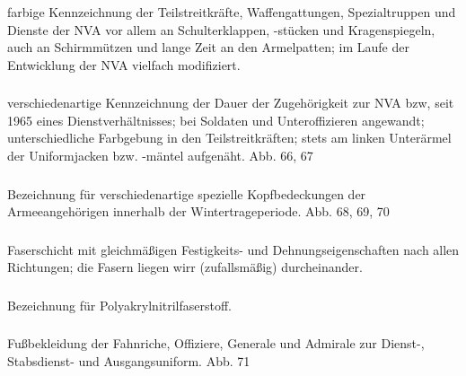 farbige Kennzeichnung der Teilstreitkräfte, Waffengattungen, Spezialtruppen und Dienste der NVA vor allem an Schulterklappen, -stücken und Kragenspiegeln, auch an Schirmmützen und lange Zeit an den Armelpatten; im Laufe der Entwicklung der NVA vielfach modifiziert.

\subsubsection*{}%

verschiedenartige Kennzeichnung der Dauer der Zugehörigkeit zur NVA bzw, seit 1965 eines Dienstverhältnisses; bei Soldaten und Unteroffizieren angewandt; unterschiedliche Farbgebung in den Teilstreitkräften; stets am linken Unterärmel der Uniformjacken bzw. -mäntel aufgenäht. Abb. 66, 67

\subsubsection*{}%

Bezeichnung für verschiedenartige spezielle Kopfbedeckungen der Armeeangehörigen innerhalb der Wintertrageperiode. Abb. 68, 69, 70

\subsubsection*{}%

Faserschicht mit gleichmäßigen Festigkeits- und Dehnungseigenschaften nach allen Richtungen; die Fasern liegen wirr (zufallsmäßig) durcheinander.

\subsubsection*{}%

Bezeichnung für Polyakrylnitrilfaserstoff.

\subsubsection*{}%

Fußbekleidung der Fahnriche, Offiziere, Generale und Admirale zur Dienst-, Stabsdienst- und Ausgangsuniform. Abb. 71